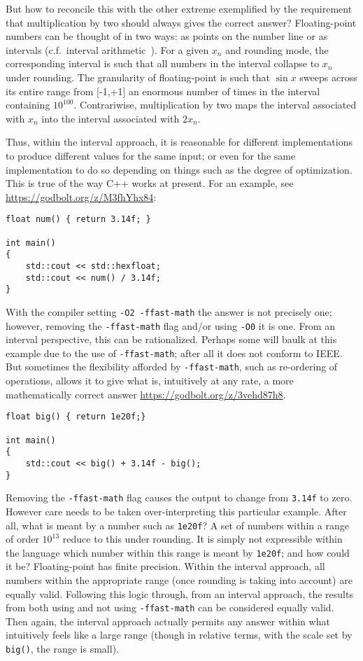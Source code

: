 \documentclass[prd,twocolumn,amsmath,amssymb,nofootinbib,eqsecnum]{revtex4-1}
\newcommand{\code}[1]{{\tt #1}}
\begin{document}
But how to reconcile this with the other extreme exemplified by the requirement that multiplication by two should always gives the correct answer? Floating-point numbers can be thought of in two ways: as points on the number line or as intervals (c.f.\ interval arithmetic~\cite{Interval}). For a given $x_n$ and rounding mode, the corresponding interval is such that all numbers in the interval collapse to $x_n$ under rounding. The granularity of floating-point is such that $\sin x$ sweeps across its entire range from [-1,+1] an enormous number of times in the interval containing $10^{100}$. Contrariwise, multiplication by two maps the interval associated with $x_n$ into the interval associated with $2x_n$.

Thus, within the interval approach, it is reasonable for different implementations to produce different
values for the same input; or even for the same implementation to do so depending on things such as the degree of optimization. This is true of the way C++ works at present. For an example, see \href{https://godbolt.org/z/M3fhYhx84}{https://godbolt.org/z/M3fhYhx84}:
\begin{verbatim}
float num() { return 3.14f; }

int main()
{
    std::cout << std::hexfloat;
    std::cout << num() / 3.14f;
}
\end{verbatim}
With the compiler setting \code{-O2 -ffast-math} the answer is not precisely one; however, removing the \code{-ffast-math} flag and/or using \code{-O0} it is one. From an interval perspective, this can be rationalized. Perhaps some will baulk at this example due to the use of \code{-ffast-math}; after all it does not conform to IEEE. But sometimes the flexibility afforded by \code{-ffast-math}, such as re-ordering of operations, allows it to give what is, intuitively at any rate, a more mathematically correct answer \href{https://godbolt.org/z/3vehd87h8}{https://godbolt.org/z/3vehd87h8}.
\begin{verbatim}
float big() { return 1e20f;}

int main()
{
    std::cout << big() + 3.14f - big();
}
\end{verbatim}
Removing the \code{-ffast-math} flag causes the output to change from \code{3.14f} to zero. However care needs to be taken over-interpreting this particular example. After all, what is meant by a number such as \code{1e20f}? A set of numbers within a range of order $10^{13}$ reduce to this under rounding. It is simply not expressible within the language which number within this range is meant by \code{1e20f}; and how could it be? Floating-point has finite precision. Within the interval approach, all numbers within the appropriate range (once rounding is taking into account) are equally valid. Following this logic through, from an interval approach, the results from both using and not using \code{-ffast-math} can be considered equally valid. Then again, the interval approach actually permits any answer within what intuitively feels like a large range (though in relative terms, with the scale set by \code{big()}, the range is small).
\end{document}
